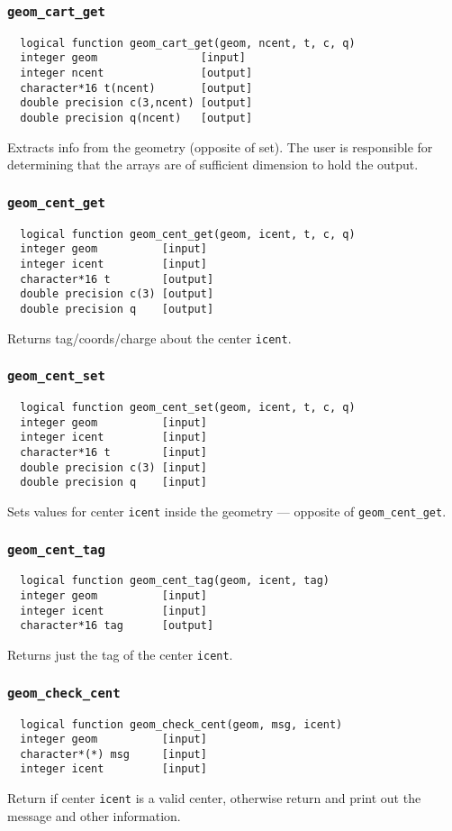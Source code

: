 \subsubsection{{\tt geom\_cart\_get}}
\begin{verbatim}
  logical function geom_cart_get(geom, ncent, t, c, q)
  integer geom                [input]
  integer ncent               [output]
  character*16 t(ncent)       [output]
  double precision c(3,ncent) [output]
  double precision q(ncent)   [output]
\end{verbatim}
Extracts info from the geometry (opposite of set).  The user is
responsible for determining that the arrays are of sufficient
dimension to hold the output.

\subsubsection{{\tt geom\_cent\_get}}
\begin{verbatim}  
  logical function geom_cent_get(geom, icent, t, c, q)
  integer geom          [input]
  integer icent         [input]
  character*16 t        [output]
  double precision c(3) [output]
  double precision q    [output]
\end{verbatim}
Returns tag/coords/charge about the center {\tt icent}.

\subsubsection{{\tt geom\_cent\_set}}
\begin{verbatim}
  logical function geom_cent_set(geom, icent, t, c, q)
  integer geom          [input]
  integer icent         [input]
  character*16 t        [input]
  double precision c(3) [input]
  double precision q    [input]
\end{verbatim}
Sets values for center {\tt icent} inside the geometry --- opposite of
\verb+geom_cent_get+.

\subsubsection{{\tt geom\_cent\_tag}}
\begin{verbatim}
  logical function geom_cent_tag(geom, icent, tag)
  integer geom          [input]
  integer icent         [input]
  character*16 tag      [output]
\end{verbatim}
Returns just the tag of the center {\tt icent}.

\subsubsection{{\tt geom\_check\_cent}}
\begin{verbatim}
  logical function geom_check_cent(geom, msg, icent)
  integer geom          [input]
  character*(*) msg     [input]
  integer icent         [input]
\end{verbatim}
Return \TRUE if center \verb+icent+ is a valid center,
otherwise return \FALSE and print out the message and other
information. 

